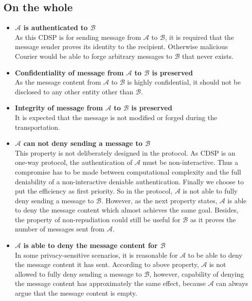 \subsection{On the whole}
\begin{itemize}
\item \textbf{$\mathcal{A}$ is authenticated to $\mathcal{B}$} \\
As this CDSP is for sending message from $ \mathcal{A} $ to $ \mathcal{B} $, it is required that the message sender proves its identity to the recipient. Otherwise malicious Courier would be able to forge arbitrary messages to $ \mathcal{B} $ that never exists.

\item \textbf{Confidentiality of message from $\mathcal{A}$ to $\mathcal{B}$ is preserved} \\
As the message content from $ \mathcal{A} $ to $ \mathcal{B} $ is highly confidential, it should not be disclosed to any other entity other than $ \mathcal{B} $.

\item \textbf{Integrity of message from $\mathcal{A}$ to $\mathcal{B}$ is preserved} \\
It is expected that the message is not modified or forged during the transportation.

\item \textbf{$\mathcal{A}$ can not deny sending a message to $\mathcal{B}$} \\
This property is not deliberately designed in the protocol. As CDSP is an one-way protocol, the authentication of $ \mathcal{A} $ must be non-interactive. Thus a compromise has to be made between computational complexity and the full deniability of a non-interactive deniable authentication. Finally we choose to put the efficiency as first priority. So in the protocol, $ \mathcal{A} $ is not able to fully deny sending a message to $ \mathcal{B} $. However, as the next property states, $ \mathcal{A} $ is able to deny the message content which almost achieves the same goal. Besides, the property of non-repudiation could still be useful for $ \mathcal{B} $ as it proves the number of messages sent from $ \mathcal{A} $.

\item \textbf{$\mathcal{A}$ is able to deny the message content for $\mathcal{B}$} \\
In some privacy-sensitive scenarios, it is reasonable for $ \mathcal{A} $ to be able to deny the message content it has sent. According to above property, $ \mathcal{A} $ is not allowed to fully deny sending a message to $ \mathcal{B} $, however, capability of denying the message content has approximately the same effect, because $ \mathcal{A} $ can always argue that the message content is empty.
\end{itemize}


